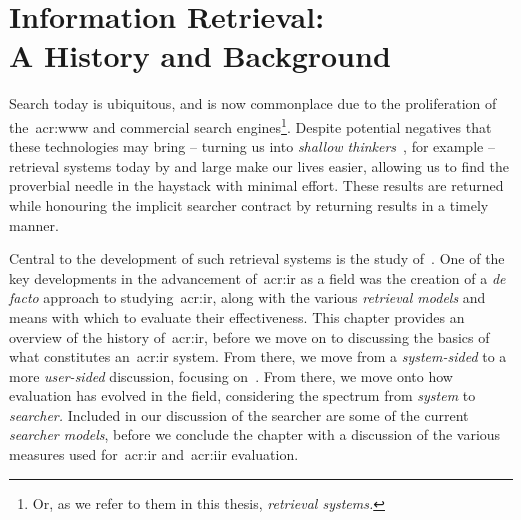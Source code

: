 
\chapter[Information Retrieval]{Information Retrieval:\\A History and Background}\label{chap:ir_background}
Search today is ubiquitous, and is now commonplace due to the proliferation of the~\gls{acr:www} and commercial search engines\footnote{Or, as we refer to them in this thesis, \emph{retrieval systems.}}. Despite potential negatives that these technologies may bring -- turning us into \emph{shallow thinkers}~\citep{carr2008google_stupid}, for example -- retrieval systems today by and large make our lives easier, allowing us to find the proverbial needle in the haystack with minimal effort. These results are returned while honouring the implicit searcher contract by returning results in a timely manner.


\begin{figure}[h]
    \centering
    \vspace{4mm}
    \label{fig:searchbox}
    \vspace{-5mm}
\end{figure}

Central to the development of such retrieval systems is the study of~. One of the key developments in the advancement of~\gls{acr:ir} as a field was the creation of a \emph{de facto} approach to studying~\gls{acr:ir}, along with the various \emph{retrieval models} and means with which to evaluate their effectiveness. This chapter provides an overview of the history of~\gls{acr:ir}, before we move on to discussing the basics of what constitutes an~\gls{acr:ir} system. From there, we move from a \emph{system-sided} to a more \emph{user-sided} discussion, focusing on~. From there, we move onto how evaluation has evolved in the field, considering the spectrum from \emph{system} to \emph{searcher.} Included in our discussion of the searcher are some of the current \emph{searcher models}, before we conclude the chapter with a discussion of the various measures used for~\gls{acr:ir} and~\gls{acr:iir} evaluation.


